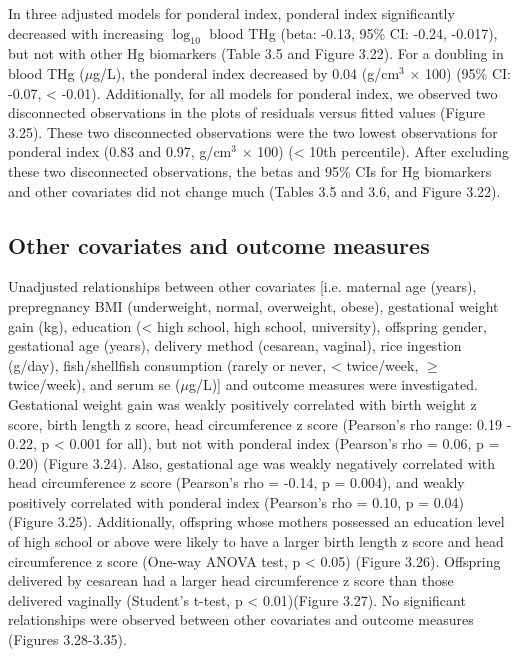 In three adjusted models for ponderal index, ponderal index significantly decreased with increasing $\log_{10}$ blood THg (beta: -0.13, 95\% CI: -0.24, -0.017), but not with other Hg biomarkers (Table 3.5 and Figure 3.22). For a doubling in blood THg (${\mu}$g/L), the ponderal index decreased by 0.04 (g/cm$^{3}$ \({\times}\) 100) (95\% CI: -0.07, < -0.01). Additionally, for all models for ponderal index, we observed two disconnected observations in the plots of residuals versus fitted values (Figure 3.25). These two disconnected observations were the two lowest observations for ponderal index (0.83 and 0.97, g/cm$^{3}$ \({\times}\) 100) (< 10th percentile). After excluding these two disconnected observations, the betas and 95\% CIs for Hg biomarkers and other covariates did not change much (Tables 3.5 and 3.6, and Figure 3.22).

\subsection{Other covariates and outcome measures}

Unadjusted relationships between other covariates [i.e. maternal age (years), prepregnancy BMI (underweight, normal, overweight, obese), gestational weight gain (kg), education (< high school, high school, university), offspring gender, gestational age (years), delivery method (cesarean, vaginal), rice ingestion (g/day), fish/shellfish consumption (rarely or never, < twice/week, ${\ge}$ twice/week), and serum se (${\mu}$g/L)] and outcome measures were investigated. Gestational weight gain was weakly positively correlated with birth weight z score, birth length z score, head circumference z score (Pearson's rho range: 0.19 - 0.22, p < 0.001 for all), but not with ponderal index (Pearson's rho = 0.06, p = 0.20) (Figure 3.24). Also, gestational age was weakly negatively correlated with head circumference z score (Pearson's rho = -0.14, p = 0.004), and weakly positively correlated with ponderal index (Pearson's rho = 0.10, p = 0.04) (Figure 3.25). Additionally, offspring whose mothers possessed an education level of high school or above were likely to have a larger birth length z score and head circumference z score (One-way ANOVA test, p < 0.05) (Figure 3.26). Offspring delivered by cesarean had a larger head circumference z score than those delivered vaginally (Student's t-test, p < 0.01)(Figure 3.27). No significant relationships were observed between other covariates and outcome measures (Figures 3.28-3.35).


